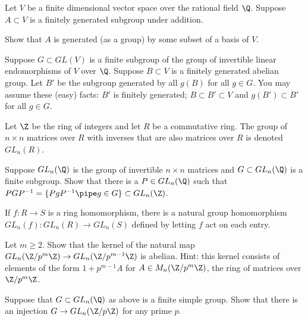Let $V$ be a finite dimensional vector space over the rational field
$\Q$. Suppose $A\subset V$ is a finitely generated subgroup under
addition.
\begin{alist}
\item Show that $A$ is generated (as a group) by some subset of a basis
of $V$.
\item Suppose $G\subset GL(V)$ is a finite subgroup of the group of
invertible linear endomorphisms of $V$ over $\Q$. Suppose $B\subset V$
is a finitely generated abelian group. Let $B'$ be the subgroup
generated by all $g(B)$ for all $g\in G$. You may assume these (easy)
facts: $B'$ is finitely generated; $B\subset B'\subset V$ and
$g(B')\subset B'$ for all $g\in G$. 

Let $\Z$ be the ring of integers and let $R$ be a commutative
ring. The group of $n\times n$ matrices over $R$ with inverses that
are also matrices over $R$ is denoted $GL_n(R)$.

Suppose $GL_n(\Q)$ is the group of invertible $n\times n$ matrices and
$G\subset GL_n(\Q)$ is a finite subgroup. Show that there is a $P\in
GL_n(\Q)$ such that $PGP^{-1}=\{PgP^{-1}\pipe g\in G\}\subset
GL_n(\Z)$.
\item If $f:R\rightarrow S$ is a ring homomorphism, there is a natural
group homomorphism $GL_n(f):GL_n(R)\rightarrow GL_n(S)$ defined by
letting $f$ act on each entry. 

Let $m\geq 2$. Show that the kernel of the natural map
$GL_n(\Z/p^m\Z)\rightarrow GL_n(\Z/p^{m-1}\Z)$ is abelian. Hint: this
kernel consists of elements of the form $1+p^{m-1}A$ for $A\in
M_n(\Z/p^m\Z)$, the ring of matrices over $\Z/p^m\Z$.
\item Suppose that $G\subset GL_n(\Q)$ as above is a finite simple group.
Show that there is an injection $G\rightarrow GL_n(\Z/p\Z)$ for any
prime $p$.
\end{alist}

